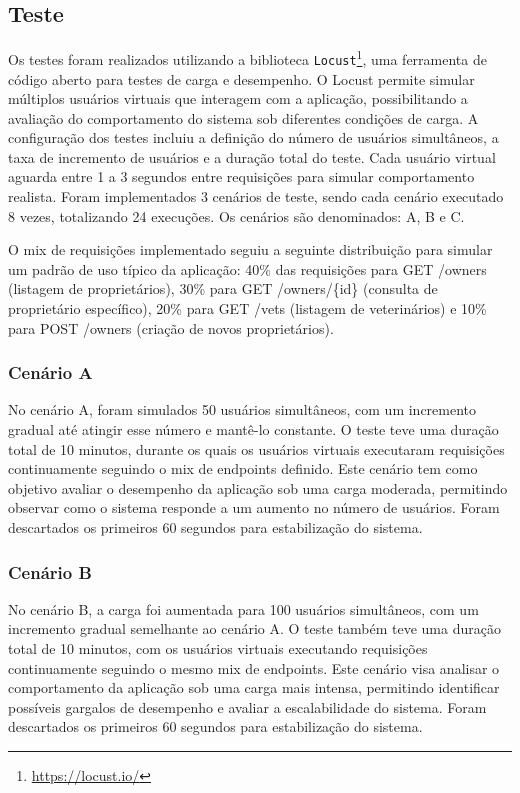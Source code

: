 \documentclass[conference]{IEEEtran}
\begin{document}
    \subsection{Teste}

    Os testes foram realizados utilizando a biblioteca \texttt{Locust}\footnote{\url{https://locust.io/}},
    uma ferramenta de código aberto para testes de carga e desempenho. O Locust permite
    simular múltiplos usuários virtuais que interagem com a aplicação,
    possibilitando a avaliação do comportamento do sistema sob diferentes
    condições de carga. A configuração dos testes incluiu a definição do número de
    usuários simultâneos, a taxa de incremento de usuários e a duração total do
    teste. Cada usuário virtual aguarda entre 1 a 3 segundos entre requisições para
    simular comportamento realista. Foram implementados 3 cenários de teste, sendo
    cada cenário executado 8 vezes, totalizando 24 execuções. Os cenários são denominados:
    A, B e C.

    O mix de requisições implementado seguiu a seguinte distribuição para simular
    um padrão de uso típico da aplicação: 40\% das requisições para GET /owners
    (listagem de proprietários), 30\% para GET /owners/\{id\} (consulta de
    proprietário específico), 20\% para GET /vets (listagem de veterinários) e
    10\% para POST /owners (criação de novos proprietários).

    \subsubsection{Cenário A}

    No cenário A, foram simulados 50 usuários simultâneos, com um incremento gradual
    até atingir esse número e mantê-lo constante. O teste teve uma duração total
    de 10 minutos, durante os quais os usuários virtuais executaram requisições continuamente
    seguindo o mix de endpoints definido. Este cenário tem como objetivo avaliar
    o desempenho da aplicação sob uma carga moderada, permitindo observar como o
    sistema responde a um aumento no número de usuários. Foram descartados os
    primeiros 60 segundos para estabilização do sistema.

    \subsubsection{Cenário B}

    No cenário B, a carga foi aumentada para 100 usuários simultâneos, com um incremento
    gradual semelhante ao cenário A. O teste também teve uma duração total de 10
    minutos, com os usuários virtuais executando requisições continuamente seguindo
    o mesmo mix de endpoints. Este cenário visa analisar o comportamento da
    aplicação sob uma carga mais intensa, permitindo identificar possíveis gargalos
    de desempenho e avaliar a escalabilidade do sistema. Foram descartados os
    primeiros 60 segundos para estabilização do sistema.
\end{document}
